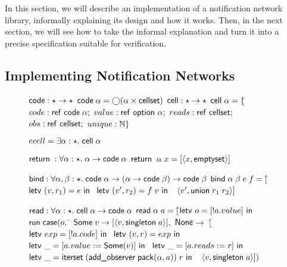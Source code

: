 \documentclass[natbib]{sigplanconf}
\begin{document}
In this section, we will describe an implementation of a notification
network library, informally explaining its design and how it
works. Then, in the next section, we will see how to take the informal
explanation and turn it into a precise specification suitable for
verification.

\subsection{Implementing Notification Networks}

\begin{figure}
{\small
\begin{specification}
$\mbox{\textsf{{code}}}\;{:}\; \star \to \star$ \nextline
$\mbox{\textsf{{code}}}\;{\alpha} = \bigcirc{(\alpha \times \mbox{\textsf{{cellset}}})}$ 
$\mbox{\textsf{{cell}}}\;{:}\; \star \to \star$ \nextline
$\mbox{\textsf{{cell}}}\;{\alpha} = \{$\=$code: \mbox{\textsf{{ref }}}\mbox{\textsf{{code}}}\;{\alpha};$ \nextline
                   \>$value: \mbox{\textsf{{ref }}}\mbox{\textsf{{option }}}{\alpha};$ \nextline
                   \>$reads: \mbox{\textsf{{ref }}}\mbox{\textsf{{cellset}}};$ \nextline
                   \>$obs:   \mbox{\textsf{{ref }}}\mbox{\textsf{{cellset}}};$ \nextline
                   \>$unique:    \mathbb{N}\}$ 

$ecell = \exists \alpha:\star.\; \mbox{\textsf{{cell}}}\;{\alpha}$ 

$\mbox{\textsf{{return}}}\; : \forall \alpha:\star.\; \alpha \to \mbox{\textsf{{code}}}\;{\alpha}$ \nextline
$\mbox{\textsf{{return}}}\;\;\alpha\;x = [\left<{x},{\mbox{\textsf{{emptyset}}}}\right>]$ 

$\mbox{\textsf{{bind}}} : \forall \alpha,\beta:\star.\; \mbox{\textsf{{code}}}\;{\alpha} \to (\alpha \to \mbox{\textsf{{code}}}\;{\beta}) \to \mbox{\textsf{{code}}}\;{\beta}$ \nextline
$\mbox{\textsf{{bind}}}\;\alpha\;\beta\;e\;f = [$\=$\mbox{\textsf{{letv }}}(v,r_1) = e\mbox{\textsf{{ in }}}$ \nextline
                        \>$\mbox{\textsf{{letv }}}(v',r_2) = f\;v\mbox{\textsf{{ in }}}$ \nextline
                        \>$\;\left<{v'},{\mbox{\textsf{{union}}}\;r_1\;r_2}\right>]$

$\mbox{\textsf{{read}}} : \forall \alpha:\star.\; \mbox{\textsf{{cell}}}\;{\alpha} \to \mbox{\textsf{{code}}}\;{\alpha}$ \nextline
$\mbox{\textsf{{read}}}\;\alpha\;a = [$\=$\mbox{\textsf{{letv }}}o = [!a.value]\mbox{\textsf{{ in }}}$ \nextline
                     \>$\mbox{\textsf{{run}}}\;\mbox{\textsf{{case}}}(o,$ \nextline
                     \>\qquad\= $\mbox{\textsf{{Some}}}\;v \to [\left<{v},{\mbox{\textsf{{singleton}}}\;a}\right>],$ \nextline
                     \>      \> $\mbox{\textsf{{None}}}$\=$ \to$ \nextline
                     \>      \>               \>$[$\=$\mbox{\textsf{{letv }}}exp = [!a.code]\mbox{\textsf{{ in }}}$ \nextline
                     \>      \>                     \>$\mbox{\textsf{{letv }}}(v,r) = exp\mbox{\textsf{{ in }}}$ \nextline
                     \>      \>                     \>$\mbox{\textsf{{letv }}}\_ = [a.value := \mbox{\textsf{{Some}}}(v)]\mbox{\textsf{{ in }}}$\nextline
                     \>      \>                     \>$\mbox{\textsf{{letv }}}\_ = [a.reads := r]\mbox{\textsf{{ in }}}$ \nextline
                     \>      \>                     \>$\mbox{\textsf{{letv }}}\_ = \mbox{\textsf{{iterset}}}\;(\mbox{\textsf{{add\_observer}}}\;\mbox{\textsf{{pack}}}({\alpha}, {a}))\;r\mbox{\textsf{{ in }}}$ \nextline
                     \>      \>                     \>$\;\left<{v},{\mbox{\textsf{{singleton}}}\;a}\right>])$ 


\end{specification}}
\end{figure}
\end{document}
